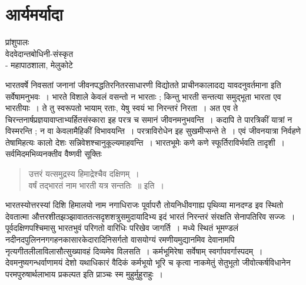 {\fontsize{15}{17}\selectfont
\presetvalues
\chapter{आर्यमर्यादा}

\begin{center}
\smallskip

प्रांशुपालः\\
वेदवेदान्तबोधिनी-संस्कृत\\
- महापाठशाला, मेलुकोटे
\addrule
\end{center}

भारतवर्षे निवसतां जनानां जीवनपद्धतिरनितरसाधारणी विद्योतते प्राचीनकालादद्य यावदनुवर्तमाना इति सर्वेषामनुभवः~। भारते विशाले केवलं वसन्तो न भारताः ; किन्तु भारती सन्तत्या समुद्भूता भारता एव भारतीयाः~। ते तु स्वरूपतो भायाम् रताः, येषु स्वयं भा निरन्तरं निरता~। अत एव ते चिरन्तनार्षप्रज्ञयावाप्ताभ्यर्हितसंस्कारा इह परत्र च समानं जीवनमनुभवन्ति~। कदापि ते पारत्रिकीं यात्रां न विस्मरन्ति ; न वा केवलामैहिकीं विभावयन्ति~। परत्राविरोधेन इह सुखमीप्सन्ते ते~। एवं जीवनयात्रा निर्वहणे तेषामिहत्यः कालो देशः सन्निवेशश्चानुकूल्यमाहवन्ति~। भारतभूमेः कणे कणे स्फूर्तिराविर्भवति तादृशी~। सर्वमिदमभिव्यनक्तीव वैष्णवी सूक्तिः 
\begin{verse}
उत्तरं यत्समुद्रस्य हिमाद्रेश्चैव दक्षिणम्~। \\
वर्षं तद्भारतं नाम भारती यत्र सन्ततिः~॥ इति~। 
\end{verse}
भारतस्योत्तरस्यां दिशि हिमालयो नाम नगाधिराजः पूर्वापरौ तोयनिधीवगाह्य पृथिव्या मानदण्ड इव स्थितो देवतात्मा औत्तरशीतझञ्झावाततत्सदृशशत्रुसमुदायादिभ्य इदं भारतं निरन्तरं संरक्षति सेनापतिरिव सज्जः~। पूर्वदक्षिणपश्चिमासु भारतभुवं परिगतो वारिधिः परिखेव जागर्ति~। मध्ये स्थितं  भूमण्डलं नदीनदपुलिननगगहनकासारकेदारादिनिसर्गतो वासयोग्यं रमणीयमुद्यानमिव देवानामपि नृत्यगीतलीलाविलासौत्सुख्यावहं दिव्यमेव विलसति~। कर्मभूमिरेषा सर्वेषाम् स्वर्गापवर्गास्पदम्~। देवमनुष्यगन्धर्वाणामयं देशो यथाधिकारं वैदिकं कर्मभूयो भूरि च कृत्वा नाकमेतुं सेतुभूतो जीवोत्कर्षविधानेन परमपुरुषार्थलाभाय प्रकल्पत इति प्राञ्चः स्म मुहुर्मुहुराहुः~। 

}
